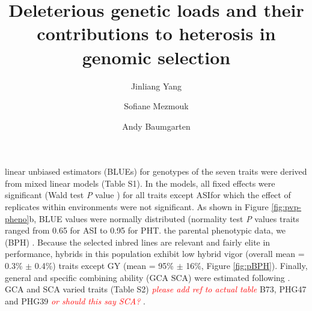 \documentclass[9pt,twocolumn,twoside]{gsajnl}
\newcommand{\jri}[1]{\textcolor{red}{ \emph{ #1}} }  \title{Deleterious genetic loads and their contributions to heterosis in genomic selection}  \author[$\ast$, 1]{Jinliang Yang} \author[$\ast$, 1, 2]{Sofiane Mezmouk} \author[$\dagger$]{Andy Baumgarten}
\begin{document}
\DIFdelbegin {}\DIFdelend \DIFaddbegin {}\DIFaddend linear unbiased estimators (BLUEs) for genotypes of the seven traits were derived from mixed linear models (Table S1). 
In the models, all fixed effects were significant (Wald test \emph{P} value \DIFdelbegin {}\DIFdelend \DIFaddbegin {}\DIFaddend ) for all traits except ASI\DIFaddbegin \DIFadd{, }\DIFaddend for which the effect of \DIFdelbegin {}\DIFdelend replicates within environments were not significant. 
As shown in \DIFdelbegin {}\DIFdelend Figure \ref{fig:pvp-pheno}b, \DIFdelbegin {}\DIFdelend BLUE values were normally distributed (normality test \emph{P} values \DIFdelbegin {}\DIFdelend \DIFaddbegin {}\DIFaddend traits ranged from 0.65 for ASI to 0.95 for PHT. 
\DIFdelbegin {}\DIFdelend \DIFaddbegin {}\DIFaddend the parental phenotypic data, we \DIFdelbegin {}\DIFdelend \DIFaddbegin {}\DIFaddend (BPH) \DIFdelbegin {}\DIFdelend \DIFaddbegin {}\DIFaddend .  
Because the selected inbred lines are \DIFdelbegin {}\DIFdelend \DIFaddbegin {}\DIFaddend relevant and fairly elite in performance, hybrids in this population exhibit \DIFdelbegin {}\DIFdelend \DIFaddbegin {}\DIFaddend low hybrid vigor (overall mean \DIFdelbegin {}\DIFdelend \DIFaddbegin {}\DIFaddend = 0.3\% $\pm$ 0.4\%) \DIFdelbegin {}\DIFdelend \DIFaddbegin {}\DIFaddend traits except GY (mean \DIFdelbegin {}\DIFdelend \DIFaddbegin {}\DIFaddend = 95\% $\pm$ 16\%, Figure \ref{fig:pBPH}). 
Finally, general and specific combining ability (GCA \DIFdelbegin {}\DIFdelend \DIFaddbegin {}\DIFaddend SCA) were estimated following \citep{Falconer1996}. 
\DIFdelbegin {}\DIFdelend GCA and SCA varied \DIFdelbegin {}\DIFdelend \DIFaddbegin {}\DIFaddend traits (Table S2) \DIFdelbegin {}\DIFdelend \DIFaddbegin \jri{please add ref to actual table}\DIFaddend B73, PHG47 and PHG39 \DIFdelbegin {}\DIFdelend \DIFaddbegin {}\jri{or should this say SCA?} \DIFaddend .
\end{document}
